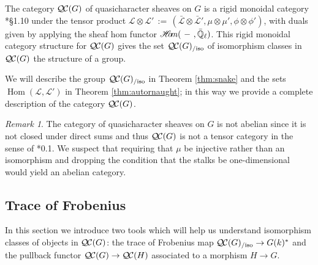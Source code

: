 \documentclass{amsart}
\theoremstyle{plain}
\theoremstyle{definition}
\theoremstyle{remark}
\newtheorem{remark}[theorem]{Remark}
\newcommand{\EE}{\mathbb{\bar Q}_\ell}
\newcommand{\bFq}{\bar{k}}
\newcommand{\Fq}{k}
\newcommand{\Weil}[1]{\mathcal{W}_{#1}}
\DeclareMathOperator{\Gal}{Gal}
\newcommand{\Frob}[1]{\operatorname{F}_{#1}}
\DeclareMathOperator{\Hom}{Hom}
\newcommand{\sheafHom}{{\mathscr{H}\hskip-4pt{\it o}\hskip-2pt{\it m}}}
\newcommand{\ceq}{{\, :=\, }}
\newcommand{\qcs}[1]{{\mathcal{#1}}}
\newcommand{\gqcs}[1]{{\mathcal{\bar #1}}}
\newcommand{\QC}{{\mathcal{Q\hskip-0.8pt C}}}
\newcommand{\QCiso}[1]{\QC(#1)_{/\text{iso}}}
\newcommand{\bG}{\bar{G}}
\begin{document}
The category $\QC(G)$ of quasicharacter sheaves on $G$ is a rigid monoidal category
\cite{etingof:09a}*{\S1.10} under the tensor product
$\qcs{L} \otimes \qcs{L'} \ceq (\gqcs{L}\otimes\gqcs{L'}, \mu\otimes\mu', \phi\otimes \phi')$,
with duals given by applying the sheaf hom functor
$\sheafHom(\ - \ ,\EE)$.
This rigid monoidal category structure for $\QC(G)$ gives the set $\QCiso{G}$
of isomorphism classes in $\QC(G)$ the structure of a group.

We will describe the group $\QCiso{G}$ in Theorem \ref{thm:snake}
and the sets $\Hom(\qcs{L},\qcs{L}')$ in Theorem \ref{thm:autornaught}; in this way we provide a complete description of the category $\QC(G)$.

\begin{remark}
The category of quasicharacter sheaves on $G$ is not abelian since it is not closed under direct sums and thus $\QC(G)$
is not a tensor category in the sense of \cite{deligne:02a}*{0.1}.  We suspect that requiring that $\mu$ be injective rather than
an isomorphism and dropping the condition that the stalks be one-dimensional would yield an abelian category.
\end{remark}

\subsection{Trace of Frobenius}\label{sec:Frob}

In this section we introduce two tools which will help us understand isomorphism classes of objects in $\QC(G)$: the trace of Frobenius map $\QCiso{G} \to G(k)^*$ and the pullback functor $\QC(G) \to \QC(H)$ associated to a morphism $H \to G$.

\end{document}
